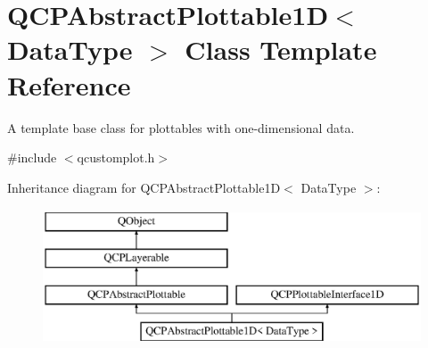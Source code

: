 \hypertarget{class_q_c_p_abstract_plottable1_d}{}\section{Q\+C\+P\+Abstract\+Plottable1D$<$ Data\+Type $>$ Class Template Reference}
\label{class_q_c_p_abstract_plottable1_d}


A template base class for plottables with one-\/dimensional data.  




{\ttfamily \#include $<$qcustomplot.\+h$>$}

Inheritance diagram for Q\+C\+P\+Abstract\+Plottable1D$<$ Data\+Type $>$\+:\begin{figure}[H]
\begin{center}
\leavevmode
\includegraphics[height=4.000000cm]{d9/dbd/class_q_c_p_abstract_plottable1_d}
\end{center}
\end{figure}
